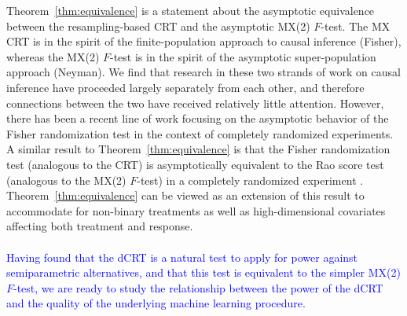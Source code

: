 \documentclass[ejs]{imsart}
\numberwithin{equation}{section}
\theoremstyle{plain}
\theoremstyle{definition}
\theoremstyle{remark}
\newcommand{\prx}{\bm X}
\newcommand{\prz}{\bm Z}
\newcommand{\pry}{{\bm Y}}
\begin{document}
Theorem~\ref{thm:equivalence} is a statement about the asymptotic equivalence between the resampling-based CRT and the asymptotic MX(2) $F$-test. The MX CRT is in the spirit of the finite-population approach to causal inference (Fisher), whereas the MX(2) $F$-test is in the spirit of the asymptotic super-population approach (Neyman). We find that research in these two strands of work on causal inference have proceeded largely separately from each other, and therefore connections between the two have received relatively little attention. However, there has been a recent line of work \cite{Ding2017,Wu2020a,Zhao2021} focusing on the asymptotic behavior of the Fisher randomization test in the context of completely randomized experiments. A similar result to Theorem~\ref{thm:equivalence} is that the Fisher randomization test (analogous to the CRT) is asymptotically equivalent to the Rao score test (analogous to the MX(2) $F$-test) in a completely randomized experiment \cite[Theorem A.1]{Ding2017}. Theorem~\ref{thm:equivalence} can be viewed as an extension of this result to accommodate for non-binary treatments as well as high-dimensional covariates affecting both treatment and response.






\paragraph{}

\textcolor{blue}{Having found that the dCRT is a natural test to apply for power against semiparametric alternatives, and that this test is equivalent to the simpler MX(2) $F$-test, we are ready to study the relationship between the power of the dCRT and the quality of the underlying machine learning procedure.}

%	
\end{document}
